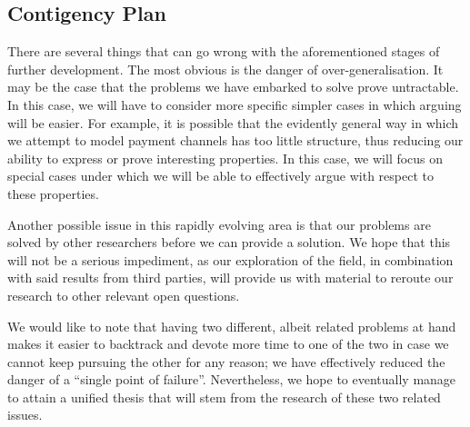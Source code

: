 \subsection{Contigency Plan}
  There are several things that can go wrong with the aforementioned stages of further
  development. The most obvious is the danger of over-generalisation. It may be the case
  that the problems we have embarked to solve prove untractable. In this case, we will
  have to consider more specific simpler cases in which arguing will be easier. For
  example, it is possible that the evidently general way in which we attempt to model
  payment channels has too little structure, thus reducing our ability to express or prove
  interesting properties. In this case, we will focus on special cases under which we will
  be able to effectively argue with respect to these properties.

  Another possible issue in this rapidly evolving area is that our problems are solved by
  other researchers before we can provide a solution. We hope that this will not be a
  serious impediment, as our exploration of the field, in combination with said results
  from third parties, will provide us with material to reroute our research to other
  relevant open questions.

  We would like to note that having two different, albeit related problems at hand makes
  it easier to backtrack and devote more time to one of the two in case we cannot keep
  pursuing the other for any reason; we have effectively reduced the danger of a ``single
  point of failure''. Nevertheless, we hope to eventually manage to attain a unified
  thesis that will stem from the research of these two related issues.
